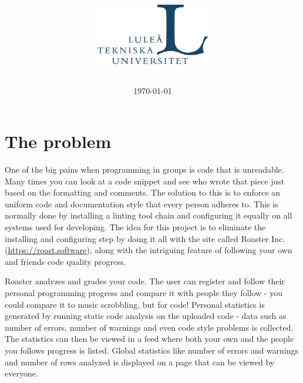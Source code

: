 \documentclass[12pt,a4paper]{report}
\title{
    \coursecode{} \\
    \coursename{} \\
    \vspace{1.8em}
    \begin{figure}[H]
        \centering
        
    \end{figure}
    \textbf{\projectname{}} \break
    \author{
        \authorsinfo{}
    } \break{}
    \schoolinfo{}
    \vspace{1.8em}
    \begin{figure}[H]
        \centering
        \includegraphics[width=5cm]{LTU.jpg}
    \end{figure}
}
\date{\today}
\begin{document}
\maketitle
\thispagestyle{empty} %
\newpage

{\hypersetup{linkcolor=black}
\tableofcontents}
\newpage

\newpage

\chapter{The problem}
One of the big pains when programming in groups is code that is unreadable. Many times you can look at a code snippet and see who wrote that piece
just based on the formatting and comments. The solution to this is to enforce an uniform code and documentation style that every person adheres to.
This is normally done by installing a linting tool chain and configuring it equally on all systems used for developing.
The idea for this project is to eliminate the installing and configuring step by doing it all with the site called Roaster Inc. (\url{https://roast.software}), along with the intriguing feature of following your own and friends code quality progress.

Roaster analyzes and grades your code. The user can register and follow their personal programming progress and compare it with people they follow - you could compare it to music scrobbling, but for code! Personal statistics is generated by running static code analysis on the uploaded code - data such as number of errors, number of warnings and even code style problems is collected. The statistics can then be viewed in a feed where both your own and the people you follows progress is listed. Global statistics like number of errors and warnings and number of rows analyzed is displayed on a page that can be viewed by everyone.

%
\end{document}
